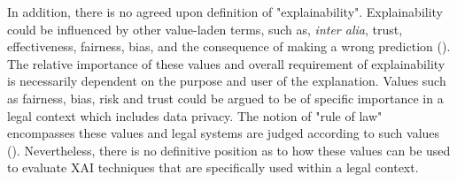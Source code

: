 In addition, there is no agreed upon definition of "explainability". Explainability could be influenced by other value-laden terms, such as, \textit{inter alia}, trust, effectiveness, fairness, bias, and the consequence of making a wrong prediction (\cite{rosenfeld2021}). The relative importance of these values and overall requirement of explainability is necessarily dependent on the purpose and user of the explanation. Values such as fairness, bias, risk and trust could be argued to be of specific importance in a legal context which includes data privacy. The notion of "rule of law" encompasses these values and legal systems are judged according to such values (\cite{greenstein2022}). Nevertheless, there is no definitive position as to how these values can be used to evaluate XAI techniques that are specifically used within a legal context.

